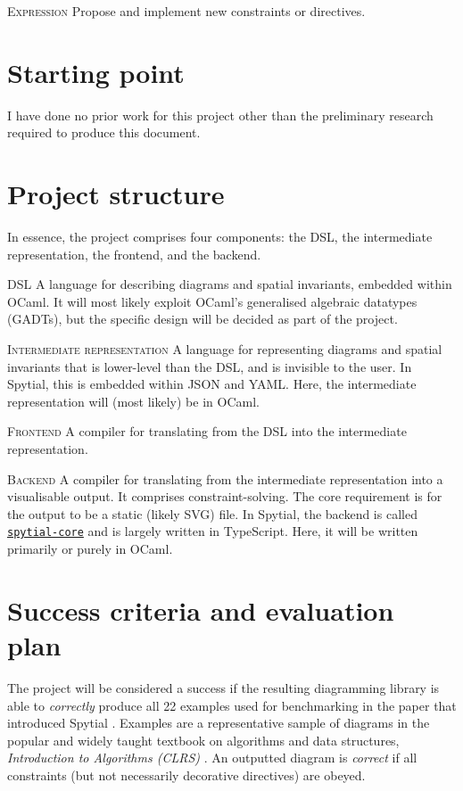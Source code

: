 \documentclass[a4paper, 12pt]{article}
\begin{document}
\textsc{Expression} \hspace{1em} Propose and implement new constraints or directives.

\section{Starting point}

I have done no prior work for this project other than the preliminary research required to produce this document.

\section{Project structure}

In essence, the project comprises four components: the DSL, the intermediate representation, the frontend, and the backend.

\textsc{DSL} \hspace{1em} A language for describing diagrams and spatial invariants, embedded within OCaml. It will most likely exploit OCaml's generalised algebraic datatypes (GADTs), but the specific design will be decided as part of the project.

\textsc{Intermediate representation} \hspace{1em} A language for representing diagrams and spatial invariants that is lower-level than the DSL, and is invisible to the user. In Spytial, this is embedded within JSON and YAML. Here, the intermediate representation will (most likely) be in OCaml.

\textsc{Frontend} \hspace{1em} A compiler for translating from the DSL into the intermediate representation.

\textsc{Backend} \hspace{1em} A compiler for translating from the intermediate representation into a visualisable output. It comprises constraint-solving. The core requirement is for the output to be a static (likely SVG) file. In Spytial, the backend is called \href{https://github.com/sidprasad/spytial-core}{\texttt{spytial-core}} and is largely written in TypeScript. Here, it will be written primarily or purely in OCaml.

\section{Success criteria and evaluation plan}

The project will be considered a success if the resulting diagramming library is able to \textit{correctly} produce all 22 examples used for benchmarking in the paper that introduced Spytial \cite{spytial}. Examples are a representative sample of diagrams in the popular and widely taught textbook on algorithms and data structures, \textit{Introduction to Algorithms (CLRS)} \cite{clrs1994}. An outputted diagram is \textit{correct} if all constraints (but not necessarily decorative directives) are obeyed.
\end{document}
